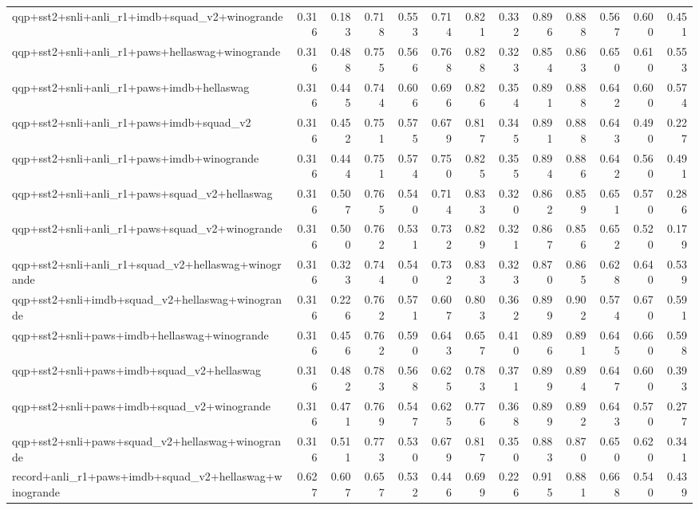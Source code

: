 \begin{table}[t]
\begin{tabular}{lrrrrrrrrrrrr}
    qqp+sst2+snli+anli\_r1+imdb+squad\_v2+winogrande & 0.316 & 0.183 & 0.718 & 0.553 & 0.714 & 0.821 & 0.332 & 0.896 & 0.888 & 0.567 & 0.600 & 0.451 \\
    qqp+sst2+snli+anli\_r1+paws+hellaswag+winogrande & 0.316 & 0.488 & 0.755 & 0.566 & 0.768 & 0.828 & 0.323 & 0.854 & 0.863 & 0.650 & 0.610 & 0.553 \\
    qqp+sst2+snli+anli\_r1+paws+imdb+hellaswag & 0.316 & 0.445 & 0.744 & 0.606 & 0.696 & 0.826 & 0.354 & 0.891 & 0.888 & 0.642 & 0.600 & 0.574 \\
    qqp+sst2+snli+anli\_r1+paws+imdb+squad\_v2 & 0.316 & 0.452 & 0.751 & 0.575 & 0.679 & 0.817 & 0.345 & 0.891 & 0.888 & 0.643 & 0.490 & 0.227 \\
    qqp+sst2+snli+anli\_r1+paws+imdb+winogrande & 0.316 & 0.444 & 0.751 & 0.574 & 0.750 & 0.825 & 0.355 & 0.894 & 0.886 & 0.642 & 0.560 & 0.491 \\
    qqp+sst2+snli+anli\_r1+paws+squad\_v2+hellaswag & 0.316 & 0.507 & 0.765 & 0.540 & 0.714 & 0.833 & 0.320 & 0.862 & 0.859 & 0.651 & 0.570 & 0.286 \\
    qqp+sst2+snli+anli\_r1+paws+squad\_v2+winogrande & 0.316 & 0.500 & 0.762 & 0.531 & 0.732 & 0.829 & 0.321 & 0.867 & 0.856 & 0.652 & 0.520 & 0.179 \\
    qqp+sst2+snli+anli\_r1+squad\_v2+hellaswag+winogrande & 0.316 & 0.323 & 0.744 & 0.540 & 0.732 & 0.833 & 0.323 & 0.870 & 0.865 & 0.628 & 0.640 & 0.539 \\
    qqp+sst2+snli+imdb+squad\_v2+hellaswag+winogrande & 0.316 & 0.226 & 0.762 & 0.571 & 0.607 & 0.803 & 0.362 & 0.899 & 0.902 & 0.574 & 0.670 & 0.591 \\
    qqp+sst2+snli+paws+imdb+hellaswag+winogrande & 0.316 & 0.456 & 0.762 & 0.590 & 0.643 & 0.657 & 0.410 & 0.896 & 0.891 & 0.645 & 0.660 & 0.598 \\
    qqp+sst2+snli+paws+imdb+squad\_v2+hellaswag & 0.316 & 0.482 & 0.783 & 0.568 & 0.625 & 0.783 & 0.371 & 0.899 & 0.894 & 0.647 & 0.600 & 0.393 \\
    qqp+sst2+snli+paws+imdb+squad\_v2+winogrande & 0.316 & 0.471 & 0.769 & 0.547 & 0.625 & 0.776 & 0.368 & 0.899 & 0.892 & 0.643 & 0.570 & 0.277 \\
    qqp+sst2+snli+paws+squad\_v2+hellaswag+winogrande & 0.316 & 0.511 & 0.773 & 0.530 & 0.679 & 0.817 & 0.350 & 0.883 & 0.870 & 0.650 & 0.620 & 0.341 \\
    record+anli\_r1+paws+imdb+squad\_v2+hellaswag+winogrande & 0.627 & 0.607 & 0.657 & 0.532 & 0.446 & 0.699 & 0.226 & 0.915 & 0.881 & 0.668 & 0.540 & 0.439 \\

\end{tabular}
\end{table}
